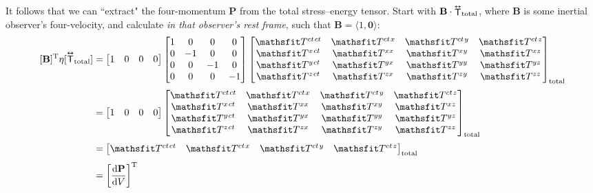 \documentclass[12pt]{article}
\renewcommand{\vv}[1]{\mathbf{#1}}
\newcommand{\dd}[1]{\mathrm{d}#1}
\newcommand{\tightoverset}[2]{%
  \mathop{#2}\limits^{\vbox to -.5ex{\kern-0.75ex\hbox{$#1$}\vss}}}
\newcommand{\inlinedy}[1]{\tightoverset{\text{\tiny$\bm\leftrightarrow$}}{#1}}
\newcommand{\capdy}[1]{ \overset{ \text{\tiny$\bm\leftrightarrow$} }{\vphantom{\text{\small{A}}}\smash{#1}} }
\begin{document}
It follows that we can ``extract" the four-momentum $\vv P$ from the total stress--energy tensor. Start with $\vv B \cdot {\inlinedy{\mathsf{T}}} _{\textrm{total}}$, where $\vv B$ is some inertial observer's four-velocity, and calculate \emph{in that observer's rest frame}, such that ${ \vv B = \langle 1, \vv 0 \rangle }$:
\begin{equation*}
\begin{aligned}
\, [ \vv B ]^{\mathrm{T}} \eta [ \capdy{\mathsf{T}} _{\mathrm{total}} ]
&=
\begin{bmatrix}
1 & 0 & 0 & 0
\end{bmatrix}
\begin{bmatrix}
1 & 0 & 0 & 0 \\
0 & -1 & 0 & 0 \\
0 & 0 & -1 & 0 \\
0 & 0 & 0 & -1
\end{bmatrix}
\begin{bmatrix}
\mathsfit T^{ct \mkern1.5mu ct} & \mathsfit T^{ct \mkern1.5mu x} & \mathsfit T^{ct \mkern1.5mu y} & \mathsfit T^{ct \mkern1.5mu z} \\
\mathsfit T^{x \mkern1.5mu ct} & \mathsfit T^{x x} & \mathsfit T^{x y} & \mathsfit T^{x z}  \\
\mathsfit T^{y \mkern1.5mu ct} & \mathsfit T^{y x} & \mathsfit T^{y y} & \mathsfit T^{y z}  \\
\mathsfit T^{z \mkern1.5mu ct} & \mathsfit T^{z x} & \mathsfit T^{z y} & \mathsfit T^{z z} 
\end{bmatrix} _{\mathrm{total}}
\\[3pt]
&=
\begin{bmatrix}
1 & 0 & 0 & 0
\end{bmatrix}
\begin{bmatrix}
\mathsfit T^{ct \mkern1.5mu ct} & \mathsfit T^{ct \mkern1.5mu x} & \mathsfit T^{ct \mkern1.5mu y} & \mathsfit T^{ct \mkern1.5mu z} \\
\mathsfit T^{x \mkern1.5mu ct} & \mathsfit T^{x x} & \mathsfit T^{x y} & \mathsfit T^{x z}  \\
\mathsfit T^{y \mkern1.5mu ct} & \mathsfit T^{y x} & \mathsfit T^{y y} & \mathsfit T^{y z}  \\
\mathsfit T^{z \mkern1.5mu ct} & \mathsfit T^{z x} & \mathsfit T^{z y} & \mathsfit T^{z z} 
\end{bmatrix} _{\mathrm{total}}
\\[3pt]
&=
\begin{bmatrix}
\mathsfit T^{ct \mkern1.5mu ct} & \mathsfit T^{ct \mkern1.5mu x} & \mathsfit T^{ct \mkern1.5mu y} & \mathsfit T^{ct \mkern1.5mu z}
\end{bmatrix}_{\mathrm{total}}
\\[3pt]
&=
\left[ \dfrac{\dd \vv P}{\dd V} \right]^{\mathrm{T}}
\end{aligned}
\end{equation*}
\end{document}
